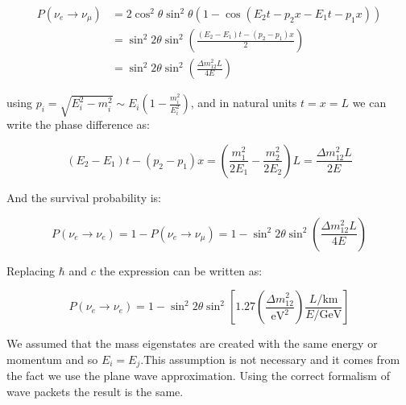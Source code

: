 \documentclass[
  letterpaper,
  DIV=11,
  numbers=noendperiod]{scrreprt}
\begin{document}
\[
\begin{aligned}
P(\nu_e \rightarrow \nu_\mu)&= 2 \cos^2\theta\sin^2\theta ( 1 - \cos (E_2t - p_2x - E_1 t - p_1 x))\\
&= \sin^2 2\theta \sin^2 \left(\frac{(E_2 - E_1)t - (p_2 - p_1)x }{2}\right) \\ 
&=\sin^2 2\theta \sin^2 \left(\frac{\Delta m_{12}^2 L}{4E}\right)
\end{aligned}
\]

using \(p_i = \sqrt{E^2_i -m_i^2}\sim E_i(1-\frac{m^2_i}{E_i^2})\), and
in natural units \(t = x = L\) we can write the phase difference as:

\[(E_2 - E_1)t - (p_2 - p_1)x = (\frac{m_1^2}{2E_1}-\frac{m_2^2}{2E_2})L = \frac{\Delta m_{12}^2L}{2E}\]

And the survival probability is:

\[P(\nu_e \rightarrow \nu_e)  = 1 - P(\nu_e \rightarrow \nu_\mu) = 1- \sin^2 2\theta \sin^2\left(\frac{\Delta m_{12}^2 L}{4E}\right)\]

Replacing \(\hbar\) and \(c\) the expression can be written as:

\[P(\nu_e \rightarrow \nu_e)  = 1 - \sin^2 2\theta \sin^2\left[1.27 \left(\frac{\Delta m^2_{12}}{\mathrm{eV}^2}\right)\frac{L/\mathrm{km}}{E/\mathrm{GeV}}\right]\]

We assumed that the mass eigenstates are created with the same energy or
momentum and so \(E_i = E_j\).This assumption is not necessary and it
comes from the fact we use the plane wave approximation. Using the
correct formalism of wave packets the result is the same.
\end{document}

